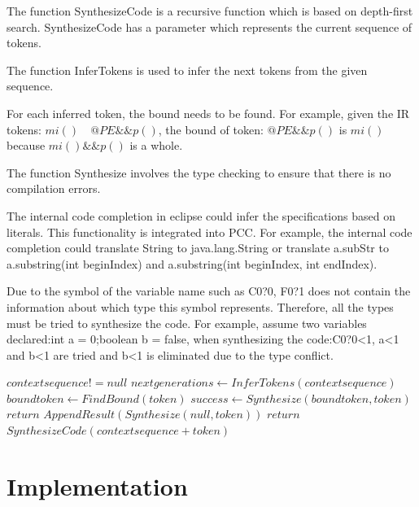 \documentclass{sig-alternate-05-2015}
\begin{document}
The function SynthesizeCode is a recursive function which is based on depth-first search. SynthesizeCode has a parameter which represents the current sequence of tokens.

The function InferTokens is used to infer the next tokens from the given sequence.

For each inferred token, the bound needs to be found. For example, given the IR tokens: $mi()\quad @PE\&\&p()$, the bound of token: $@PE\&\&p()$ is $mi()$ because $mi()\&\&p()$ is a whole.

The function Synthesize involves the type checking to ensure that there is no compilation errors.

The internal code completion in eclipse could infer the specifications based on literals. This functionality is integrated into PCC. For example, the internal code completion could translate String to java.lang.String or translate a.subStr to a.substring(int beginIndex) and a.substring(int beginIndex, int endIndex).

Due to the symbol of the variable name such as C0?0, F0?1 does not contain the information about which type this symbol represents. Therefore, all the types must be tried to synthesize the code. For example, assume two variables declared:int a = 0;boolean b = false, when synthesizing the code:C0?0<1, a<1 and b<1 are tried and b<1 is eliminated due to the type conflict.
\vspace{-0.5cm}
\\\begin {algorithm}
\caption {$SynthesizeCode(contextsequence)$}
\label{algorsyn}
\begin {algorithmic}
\REQUIRE $contextsequence != null$
\STATE $nextgenerations\leftarrow InferTokens(contextsequence)$
\STATE $boundtoken\leftarrow FindBound(token)$
\STATE $success\leftarrow Synthesize(boundtoken, token)$
\STATE $return$
\ENDIF
{}
\STATE $AppendResult(Synthesize(null, token))$
\STATE $return$
\ENDIF
\STATE $SynthesizeCode(contextsequence + token)$
\ENDFOR
\end {algorithmic}
\end {algorithm}
\vspace{-0.25cm}

\vspace{-0.1cm}
\section{Implementation}
\end{document}
